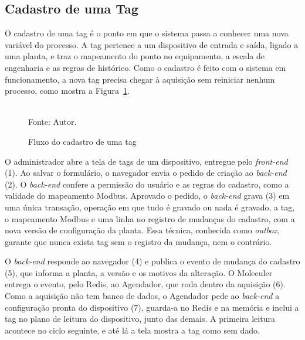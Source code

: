\subsection{Cadastro de uma Tag}

\par O cadastro de uma tag é o ponto em que o sistema passa a conhecer uma nova variável do processo. A tag pertence a um dispositivo de entrada e saída, ligado a uma planta, e traz o mapeamento do ponto no equipamento, a escala de engenharia e as regras de histórico. Como o cadastro é feito com o sistema em funcionamento, a nova tag precisa chegar à aquisição sem reiniciar nenhum processo, como mostra a Figura~\ref{fig:fx_cadastro_tag}.

\begin{figure}[H]
    \centering
    \caption{Fluxo do cadastro de uma tag}
    \label{fig:fx_cadastro_tag}
    \vspace{0.4cm}
    \vspace{0.2cm} \\
    Fonte: Autor.
\end{figure}

\par O administrador abre a tela de tags de um dispositivo, entregue pelo \emph{front-end} (1). Ao salvar o formulário, o navegador envia o pedido de criação ao \emph{back-end} (2). O \emph{back-end} confere a permissão do usuário e as regras do cadastro, como a validade do mapeamento Modbus. Aprovado o pedido, o \emph{back-end} grava (3) em uma única transação, operação em que tudo é gravado ou nada é gravado, a tag, o mapeamento Modbus e uma linha no registro de mudanças do cadastro, com a nova versão de configuração da planta. Essa técnica, conhecida como \emph{outbox}, garante que nunca exista tag sem o registro da mudança, nem o contrário.

\par O \emph{back-end} responde ao navegador (4) e publica o evento de mudança do cadastro (5), que informa a planta, a versão e os motivos da alteração. O Moleculer entrega o evento, pelo Redis, ao Agendador, que roda dentro da aquisição (6). Como a aquisição não tem banco de dados, o Agendador pede ao \emph{back-end} a configuração pronta do dispositivo (7), guarda-a no Redis e na memória e inclui a tag no plano de leitura do dispositivo, junto das demais. A primeira leitura acontece no ciclo seguinte, e até lá a tela mostra a tag como sem dado.

